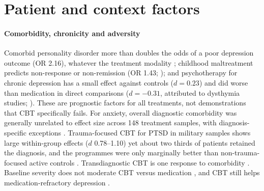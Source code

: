 \section{Patient and context factors}\label{sec:patients}
\paragraph{Comorbidity, chronicity and adversity} Comorbid personality disorder more than doubles the odds of a poor depression outcome (OR 2.16), whatever the treatment modality \citep{newtonhowes2014personality}; childhood maltreatment predicts non-response or non-remission (OR 1.43; \citealp{nanni2012maltreat}); and psychotherapy for chronic depression has a small effect against controls ($d=0.23$) and did worse than medication in direct comparisons ($d=-0.31$, attributed to dysthymia studies; \citealp{Cuijpers2010Chronic}).
These are prognostic factors for all treatments, not demonstrations that CBT specifically fails.
For anxiety, overall diagnostic comorbidity was generally unrelated to effect size across 148 treatment samples, with diagnosis-specific exceptions \citep{olatunji2010comorbid}.
Trauma-focused CBT for PTSD in military samples shows large within-group effects ($d$ 0.78--1.10) yet about two thirds of patients retained the diagnosis, and the programmes were only marginally better than non-trauma-focused active controls \citep{steenkamp2015military}.
Transdiagnostic CBT is one response to comorbidity \citep{newby2015transdiagnostic}.
Baseline severity does not moderate CBT versus medication \citep{Weitz2015Severity}, and CBT still helps medication-refractory depression \citep{Wiles2016CoBalTLong}.

